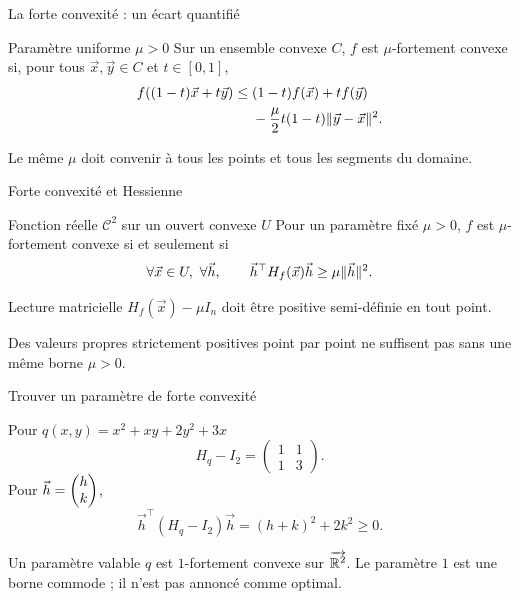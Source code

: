 \begin{frame}[t]{La forte convexité : un écart quantifié}
\coursanalyse
\begin{notion}{Paramètre uniforme $\mu>0$}
Sur un ensemble convexe $C$, $f$ est $\mu$-fortement convexe si, pour tous $\vec x,\vec y\in C$ et $t\in[0,1]$,
\[\begin{aligned}
f((1-t)\vec x+t\vec y)\le{}&(1-t)f(\vec x)+tf(\vec y)\\
&-\frac\mu2t(1-t)\lVert \vec y-\vec x\rVert^2.
\end{aligned}\]
\end{notion}
\vfill Le même $\mu$ doit convenir à tous les points et tous les segments du domaine.
\end{frame}

\begin{frame}[t]{Forte convexité et Hessienne}
\coursanalyse
\begin{theoreme}{Fonction réelle $\mathcal C^2$ sur un ouvert convexe $U$}
Pour un paramètre fixé $\mu>0$, $f$ est $\mu$-fortement convexe si et seulement si
\[\forall\vec x\in U,\ \forall\vec h,\qquad
\vec h^\top H_f(\vec x)\vec h\ge\mu\lVert \vec h\rVert^2.\]
\end{theoreme}
\begin{resultat}{Lecture matricielle}
$H_f(\vec x)-\mu I_n$ doit être positive semi-définie en tout point.
\end{resultat}
\vfill Des valeurs propres strictement positives point par point ne suffisent pas sans une même borne $\mu>0$.
\end{frame}

\begin{frame}[t]{Trouver un paramètre de forte convexité}
\coursanalyse
\begin{exemple}{Pour $q(x,y)=x^2+xy+2y^2+3x$}
\[H_q-I_2=\begin{pmatrix}1&1\\1&3\end{pmatrix}.\]
Pour $\vec h=\begin{pmatrix}h\\k\end{pmatrix}$,
\[\vec h^\top(H_q-I_2)\vec h=(h+k)^2+2k^2\ge0.\]
\end{exemple}
\begin{resultat}{Un paramètre valable}
$q$ est $1$-fortement convexe sur $\overrightarrow{\mathbb R^{2}}$.
Le paramètre $1$ est une borne commode ; il n'est pas annoncé comme optimal.
\end{resultat}
\end{frame}

